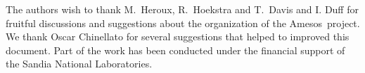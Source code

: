 \documentclass[acmtocl]{acmtrans2m}
\newcommand{\amesos}{{\sc Amesos}}
\begin{document}
The authors wish to thank M.~Heroux, R.~Hoekstra and T.~Davis and I. Duff for
fruitful discussions and suggestions about the organization of the \amesos\
           project. We thank Oscar Chinellato for several suggestions that
           helped to improved this document.  Part of the work has been
           conducted under the financial support of the Sandia National
           Laboratories.



\end{document}
